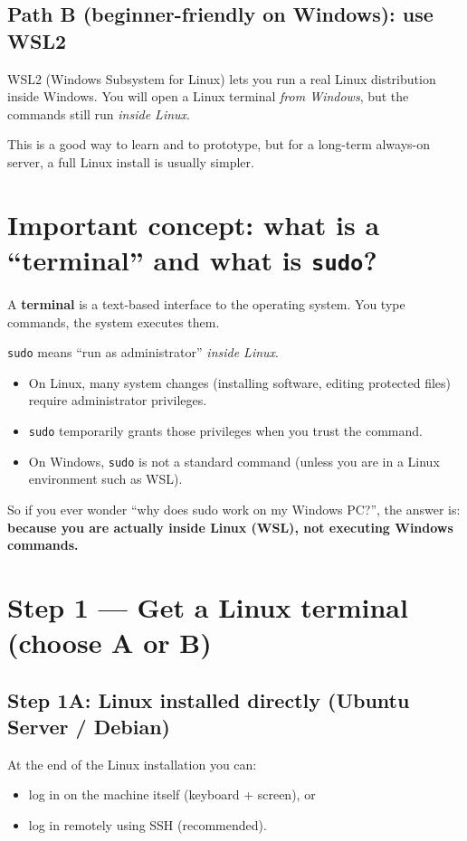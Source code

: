 \subsection{Path B (beginner-friendly on Windows): use WSL2}
WSL2 (Windows Subsystem for Linux) lets you run a real Linux distribution inside Windows.
You will open a Linux terminal \emph{from Windows}, but the commands still run \emph{inside Linux}.

This is a good way to learn and to prototype, but for a long-term always-on server,
a full Linux install is usually simpler.

\section{Important concept: what is a ``terminal'' and what is \texttt{sudo}?}
A \textbf{terminal} is a text-based interface to the operating system. You type commands, the system executes them.

\texttt{sudo} means ``run as administrator'' \emph{inside Linux}.
\begin{itemize}[leftmargin=*]
  \item On Linux, many system changes (installing software, editing protected files) require administrator privileges.
  \item \texttt{sudo} temporarily grants those privileges when you trust the command.
  \item On Windows, \texttt{sudo} is not a standard command (unless you are in a Linux environment such as WSL).
\end{itemize}

So if you ever wonder ``why does sudo work on my Windows PC?'', the answer is:
\textbf{because you are actually inside Linux (WSL), not executing Windows commands.}

\section{Step 1 --- Get a Linux terminal (choose A or B)}
\subsection{Step 1A: Linux installed directly (Ubuntu Server / Debian)}
At the end of the Linux installation you can:
\begin{itemize}[leftmargin=*]
  \item log in on the machine itself (keyboard + screen), or
  \item log in remotely using SSH (recommended).
\end{itemize}

